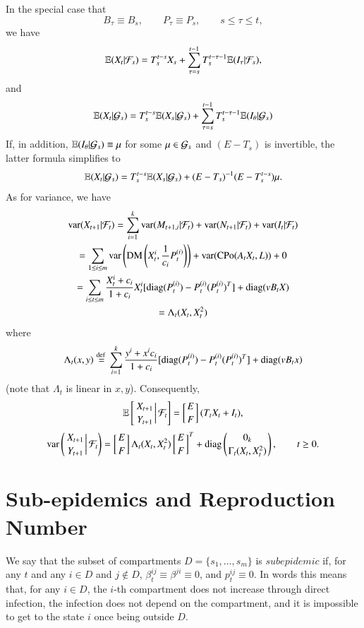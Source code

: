 \documentclass[english]{elsarticle}
\theoremstyle{plain}
\theoremstyle{remark}
\theoremstyle{plain}
\theoremstyle{definition}
\begin{document}
In the special case that 
\begin{equation}
B_{\tau}\equiv B_{s},\qquad P_{\tau}\equiv P_{s},\qquad s\leq\tau\leq t,\label{eq:speck}
\end{equation}
 we have 
\[
\mathbb{E}(X_{t}|\mathcal{F}_{s})=T_{s}^{t-s}X_{s}+\sum_{\tau=s}^{t-1}T_{s}^{t-\tau-1}\mathbb{E}(I_{\tau}|\mathcal{F}_{s}),
\]
and 
\[
\mathbb{E}(X_{t}|\mathcal{G}_{s})=T_{s}^{t-s}\mathbb{E}(X_{s}|\mathcal{G}_{s})+\sum_{\tau=s}^{t-1}T_{s}^{t-\tau-1}\mathbb{E}(I_{\theta}|\mathcal{G}_{s})
\]
If, in addition, $\mathbb{E}(I_{\theta}|\mathcal{G}_{s})\equiv\mu$ for some $\mu\in\mathcal{G}_{s}$
and $(E-T_{s})$ is invertible, the latter formula simplifies to
\[
\mathbb{E}(X_{t}|\mathcal{G}_{s})=T_{s}^{t-s}\mathbb{E}(X_{s}|\mathcal{G}_{s})+(E-T_{s})^{-1}(E-T_{s}^{t-s})\mu.
\]
As for variance, we have
\begin{multline*}
\mathrm{var}(X_{t+1}|\mathcal{F}_{t})=\sum_{i=1}^{k}\mathrm{var}(M_{t+1,i}|\mathcal{F}_{t})+\mathrm{var}(N_{t+1}|\mathcal{F}_{t})+\mathrm{var}(I_{t}|\mathcal{F}_{t})\\
=\sum_{1\leq i\leq m}\mathrm{var}\left(\mathrm{DM}\left(X_{t}^{i},\frac{1}{c_{i}}P_{t}^{(i)}\right)\right)+\mathrm{var}(\mathrm{CPo}(A_{t}X_{t},L))+0\\
=\sum_{i\leq t\leq m}\frac{X_{t}^{i}+c_{i}}{1+c_{i}}X_{t}^{i}[\mathrm{diag}(P_{t}^{(i)})-P_{t}^{(i)}(P_{t}^{(i)})^{T}]+\mathrm{diag}(vB_{t}X)\\
=\Lambda_{t}(X_{t},X_{t}^{2})
\end{multline*}
where 
\[
\Lambda_{t}(x,y)\stackrel{\text{def }}{=}\sum_{i=1}^{k}\frac{y^{i}+x^{i}c_{i}}{1+c_{i}}[\mathrm{diag}(P_{t}^{(i)})-P_{t}^{(i)}(P_{t}^{(i)})^{T}]+\mathrm{diag}(vB_{t}x)
\]
(note that $\Lambda_{t}$ is linear in $x,y$). Consequently, 
\begin{equation}
\mathbb{E}\left[\left.{X_{t+1}\atop Y_{t+1}}\right|\mathcal{F}_{t}\right]=\left[{E\atop F}\right](T_{t}X_{t}+I_{t}),\label{eq:mean}
\end{equation}
\[
\mathrm{var}\left(\left.{X_{t+1}\atop Y_{t+1}}\right|\mathcal{F}_{t}\right)=\left[{E\atop F}\right]\Lambda_{t}(X_{t},X_{t}^{2})\left[{E\atop F}\right]^{T}+\mathrm{diag}\left({0_{k}\atop \Gamma_{t}(X_{t},X_{t}^{2})}\right),\qquad t\geq0.
\]



\section{Sub-epidemics and Reproduction Number}

\label{sec:Sub-models-and-Replication}We say that the subset of compartments
$D=\{s_{1},\dots,s_{m}\}$ is $subepidemic$ if, for any $t$ and
any $i\in D$ and $j\notin D$, $\beta_{t}^{ij}\equiv\beta^{ji}\equiv0$,
and $p_{t}^{ij}\equiv0$. In words this means that, for any $i\in D$,
the $i$-th compartment does not increase through direct infection,
the infection does not depend on the compartment, and it is impossible
to get to the state $i$ once being outside $D$.
\end{document}
